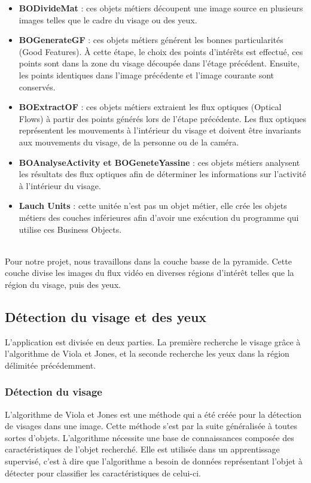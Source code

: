 \begin{itemize}
 \item \textbf{BODivideMat} : ces objets métiers découpent une image source en plusieurs images telles que 
 le cadre du visage ou des yeux.
 \item \textbf{BOGenerateGF} : ces objets métiers générent les bonnes particularités (Good Features). 
 À cette étape, le choix des points d'intérêts est effectué, ces points sont dans la zone du visage 
 découpée dans l'étage précédent. Ensuite, les points identiques dans l'image précédente et l'image 
 courante sont conservés.
 \item \textbf{BOExtractOF} : ces objets métiers extraient les flux optiques (Optical Flows) à partir 
 des points générés lors de l'étape précédente. Les flux optiques représentent les mouvements à l'intérieur 
 du visage et doivent être invariants aux mouvements du visage, de la personne ou de la caméra.
 \item \textbf{BOAnalyseActivity et BOGeneteYassine} : ces objets métiers analysent les résultats 
 des flux optiques afin de déterminer les informations sur l'activité à l'intérieur du visage.
 \item \textbf{Lauch Units} : cette unitée n'est pas un objet métier, elle crée les objets métiers des 
 couches inférieures afin d'avoir une exécution du programme qui utilise ces Business Objects.
\end{itemize}
\ \\

Pour notre projet, nous travaillons dans la couche basse de la pyramide. Cette couche divise
les images du flux vidéo en diverses régions d'intérêt telles que la région du visage, puis 
des yeux.

\subsection{Détection du visage et des yeux}

L'application est divisée en deux parties. La première recherche le visage grâce à
l'algorithme de Viola et Jones, et la seconde recherche les yeux dans la région délimitée
précédemment.

\subsubsection{Détection du visage}
L'algorithme de Viola et Jones\cite{Viola04robustreal-time} est une méthode qui a été créée pour la détection de visages dans une 
image. Cette méthode s'est par la suite généralisée à toutes sortes d'objets. L'algorithme nécessite une 
base de connaissances composée des caractéristiques de l'objet recherché. Elle est utilisée dans un 
apprentissage supervisé, c'est à dire que l'algorithme a besoin de données représentant
l'objet à détecter pour classifier les caractéristiques de celui-ci.\\

